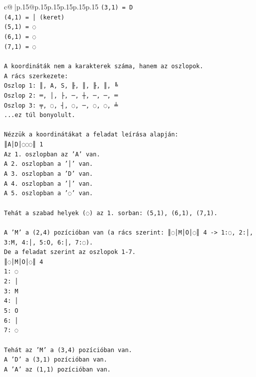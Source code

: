 \documentclass{article}
\begin{document}
{\begin{supertabular}{c@{$\;$}|p{.15\linewidth}@{}p{.15\linewidth}p{.15\linewidth}p{.15\linewidth}p{.15\linewidth}p{.15\linewidth}}
{{{\texttt{(3,1) = D} \\
\texttt{(4,1) = │ (keret)} \\
\texttt{(5,1) = ◌} \\
\texttt{(6,1) = ◌} \\
\texttt{(7,1) = ◌} \\
\\ 
\texttt{A koordináták nem a karakterek száma, hanem az oszlopok.} \\
\texttt{A rács szerkezete:} \\
\texttt{Oszlop 1: ║, A, S, ╟, ║, ╟, ║, ╚} \\
\texttt{Oszlop 2: ═, │, ├, ─, ┼, ─, ─, ═} \\
\texttt{Oszlop 3: ╤, ◌, ┤, ◌, ─, ◌, ◌, ╧} \\
\texttt{...ez túl bonyolult.} \\
\\ 
\texttt{Nézzük a koordinátákat a feladat leírása alapján:} \\
\texttt{║A│D│◌◌◌║ 1} \\
\texttt{Az 1. oszlopban az 'A' van.} \\
\texttt{A 2. oszlopban a '│' van.} \\
\texttt{A 3. oszlopban a 'D' van.} \\
\texttt{A 4. oszlopban a '│' van.} \\
\texttt{A 5. oszlopban a '◌' van.} \\
\\ 
\texttt{Tehát a szabad helyek (◌) az 1. sorban: (5,1), (6,1), (7,1).} \\
\\ 
\texttt{A 'M' a (2,4) pozícióban van (a rács szerint: ║◌│M│O│◌║ 4 {-}> 1:◌, 2:│, 3:M, 4:│, 5:O, 6:│, 7:◌).} \\
\texttt{De a feladat szerint az oszlopok 1{-}7.} \\
\texttt{║◌│M│O│◌║ 4} \\
\texttt{1: ◌} \\
\texttt{2: │} \\
\texttt{3: M} \\
\texttt{4: │} \\
\texttt{5: O} \\
\texttt{6: │} \\
\texttt{7: ◌} \\
\\ 
\texttt{Tehát az 'M' a (3,4) pozícióban van.} \\
\texttt{A 'D' a (3,1) pozícióban van.} \\
\texttt{A 'A' az (1,1) pozícióban van.} \\
}}}
\end{supertabular}}
\end{document}

